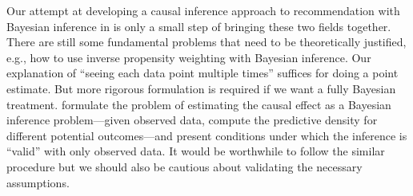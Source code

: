  Our attempt at developing a causal inference approach to recommendation with Bayesian inference in  is only a small step of bringing these two fields together. There are still some fundamental problems that need to be theoretically justified, e.g., how to use inverse propensity weighting with Bayesian inference. Our explanation of ``seeing each data point multiple times'' suffices for doing a point estimate. But more rigorous formulation is required if we want a fully Bayesian treatment. \citet{rubin1978bayesian} formulate the problem of estimating the causal effect as a Bayesian inference problem---given observed data, compute the predictive density for different potential outcomes---and present conditions under which the inference is ``valid'' with only observed data. It would be worthwhile to follow the similar procedure but we should also be cautious about validating the necessary assumptions. 
